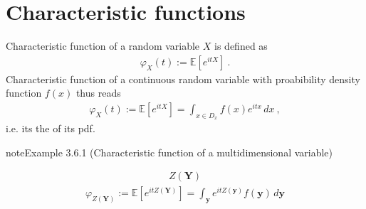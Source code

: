 \documentclass[letterpaper,10pt,english]{jupyterBook}
\begin{document}
\section{Characteristic functions}
\label{\detokenize{ch/prob/characteristic-fun:characteristic-functions}}\label{\detokenize{ch/prob/characteristic-fun:prob-characteristic-fun}}\label{\detokenize{ch/prob/characteristic-fun::doc}}
\sphinxAtStartPar
Characteristic function of a random variable \(X\) is defined as
\begin{equation*}
\begin{split}\varphi_X(t) := \mathbb{E} \left[ e^{i t X} \right] \ .\end{split}
\end{equation*}
\sphinxAtStartPar
Characteristic function of a continuous random variable with proabibility density function \(f(x)\) thus reads
\begin{equation*}
\begin{split}\varphi_X(t) := \mathbb{E} \left[ e^{i t X} \right] = \int_{x \in D_x} f(x) e^{i t x} \, dx \ ,\end{split}
\end{equation*}
\sphinxAtStartPar
i.e. its the  of its pdf.
\label{ch/prob/characteristic-fun:ex:char-fun:multidimensional}
\begin{sphinxadmonition}{note}{Example 3.6.1 (Characteristic function of a multi\sphinxhyphen{}dimensional variable)}


\begin{equation*}
\begin{split}Z(\mathbf{Y})\end{split}
\end{equation*}\begin{equation*}
\begin{split}\varphi_{Z(\mathbf{Y})} := \mathbb{E}\left[ e^{i t Z(\mathbf{Y})} \right] = \int_{\mathbf{y}} e^{i t Z(\mathbf{y})} f(\mathbf{y}) \, d \mathbf{y}\end{split}
\end{equation*}\end{sphinxadmonition}
\label{ch/prob/characteristic-fun:ex:char-fun:independent}
\end{document}

